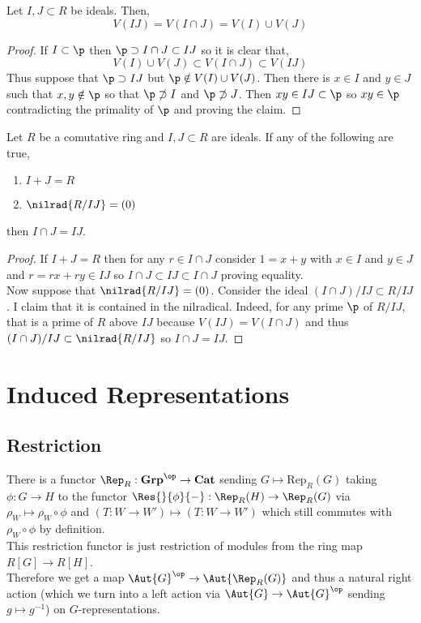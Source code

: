 \documentclass[12pt]{article}
\begin{document}
\begin{lemma}
Let $I, J \subset R$ be ideals. Then,
\[ V(IJ) = V(I \cap J) = V(I) \cup V(J) \]
\end{lemma}

\begin{proof}
If $I \subset \p$ then $\p \supset I \cap J \subset IJ$ so it is clear that,
\[ V(I) \cup V(J) \subset V(I \cap J) \subset V(IJ) \]
Thus suppose that $\p \supset IJ$ but $\p \notin V(I) \cup V(J)$. Then there is $x \in I$ and $y \in J$ such that $x, y \notin \p$ so that $\p \not\supset I$ and $\p \not \supset J$. Then $x y \in IJ \subset \p$ so $x y \in \p$ contradicting the primality of $\p$ and proving the claim.
\end{proof}

\begin{prop}
Let $R$ be a comutative ring and $I, J \subset R$ are ideals.
If any of the following are true,
\begin{enumerate}
\item $I + J = R$
\item $\nilrad{R / IJ} = (0)$
\end{enumerate}
then $I \cap J = IJ$.
\end{prop}

\begin{proof}
If $I + J = R$ then for any $r \in I \cap J$ consider $1 = x + y$ with $x \in I$ and $y \in J$ and $r = r x + ry \in IJ$ so $I \cap J \subset IJ \subset I \cap J$ proving equality. 
\bigskip\\
Now suppose that $\nilrad{R / IJ} = (0)$. Consider the ideal $(I \cap J)/IJ \subset R / IJ$. I claim that it is contained in the nilradical. Indeed, for any prime $\p$ of $R / IJ$, that is a prime of $R$ above $IJ$ because $V(IJ) = V(I \cap J)$ and thus $(I \cap J)/IJ \subset \nilrad{R / IJ}$ so $I \cap J = IJ$.
\end{proof}

\section{Induced Representations}

\subsection{Restriction}

\begin{rmk}
There is a functor $\Rep_R : \mathbf{Grp}^\op \to \mathbf{Cat}$ sending $G \mapsto \mathrm{Rep}_R(G)$ taking $\phi : G \to H$ to the functor $\Res{}{\phi}{-} : \Rep_R(H) \to \Rep_R(G)$ via $\rho_W \mapsto \rho_W \circ \phi$ and $(T : W \to W') \mapsto (T : W \to W')$ which still commutes with $\rho_W \circ \phi$ by definition.
\bigskip\\
This restriction functor is just restriction of modules from the ring map $R[G] \to R[H]$.
\bigskip\\
Therefore we get a map $\Aut{G}^\op \to \Aut{\Rep_R(G)}$ and thus a natural right action (which we turn into a left action via $\Aut{G} \to \Aut{G}^\op$ sending $g \mapsto g^{-1}$) on $G$-representations. 
\end{rmk}
\end{document}
